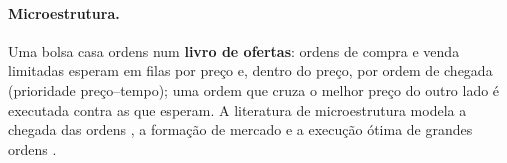 \paragraph{Microestrutura.} Uma bolsa casa ordens num \textbf{livro de ofertas}: ordens de compra e venda limitadas esperam em filas por preço e, dentro do preço, por ordem de chegada (prioridade preço--tempo); uma ordem que cruza o melhor preço do outro lado é executada contra as que esperam. A literatura de microestrutura modela a chegada das ordens \cite{hawkes1971,bacry2015}, a formação de mercado \cite{avellaneda2008} e a execução ótima de grandes ordens \cite{almgren2000}.
